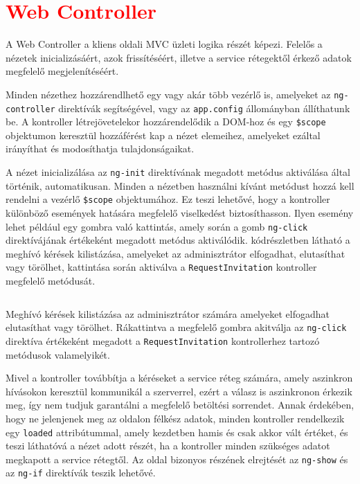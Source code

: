 \section{\textcolor{red}{Web Controller}}
\label{sec:webController}
A Web Controller a kliens oldali MVC üzleti logika részét képezi. Felelős a nézetek inicializásáért, azok frissítéséért, illetve a service rétegektől érkező adatok megfelelő megjelenítéséért. 

Minden nézethez hozzárendlhető egy vagy akár több vezérlő is, amelyeket az \texttt{ng-controller} direktívák segítségével, vagy az \texttt{app.config} állományban állíthatunk be. A kontroller létrejövetelekor hozzárendelődik a DOM-hoz és egy \texttt{\$scope} objektumon keresztül hozzáférést kap a nézet elemeihez, amelyeket ezáltal irányíthat és modosíthatja tulajdonságaikat. 

A nézet inicializálása az \texttt{ng-init} direktívának megadott metódus aktiválása által történik, automatikusan. Minden a nézetben használni kívánt metódust hozzá kell rendelni a vezérlő \texttt{\$scope}  objektumához. Ez teszi lehetővé, hogy a kontroller különböző események hatására megfelelő viselkedést biztosíthasson. Ilyen esemény lehet például egy gombra való kattintás, amely során a gomb \texttt{ng-click} direktívájának értékeként megadott metódus aktiválódik.  kódrészletben látható a meghívó kérések kilistázása, amelyeket az adminisztrátor elfogadhat, elutasíthat vagy törölhet, kattintása során aktiválva a \texttt{RequestInvitation} kontroller megfelelő metódusát.

\begin{listing}
  \inputminted[fontsize=\small]{html}{progfiles/ngClick.html}
  \caption{Meghívó kérések kilistázása az adminisztrátor számára\protect{,} amelyeket elfogadhat\protect{,} elutasíthat vagy törölhet. Rákattintva a megfelelő gombra akitválja az \texttt{ng-click} direktíva értékeként megadott\protect{,} a \texttt{RequestInvitation} kontrollerhez tartozó metódusok valamelyikét.}
  \label{lst:ngClick}
\end{listing}

Mivel a kontroller továbbítja a kéréseket a service réteg számára, amely aszinkron hívásokon keresztül kommunikál a szerverrel, ezért a válasz is aszinkronon érkezik meg, így nem tudjuk garantálni a megfelelő betöltési sorrendet. Annak érdekében, hogy ne jelenjenek meg az oldalon félkész adatok, minden kontroller rendelkezik egy \texttt{loaded} attribútummal, amely kezdetben hamis és csak akkor vált értéket, és teszi láthatóvá a nézet adott részét, ha a kontroller minden szükséges adatot megkapott a service rétegtől. Az oldal bizonyos részének elrejtését az  \texttt{ng-show} és az \texttt{ng-if} direktívák teszik lehetővé. 

